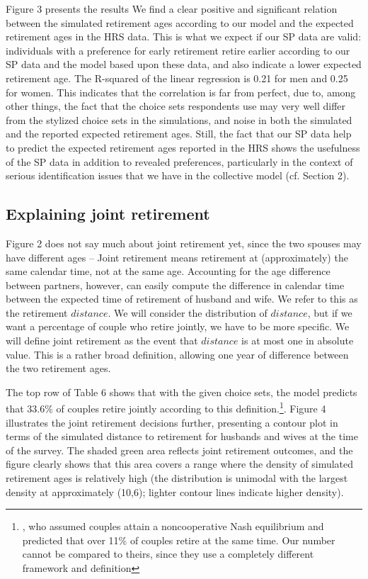 \documentclass[11pt,letter]{article}
\begin{document}
Figure 3 presents the results We find a clear positive and significant relation between the simulated retirement ages according to our model and the expected retirement ages in the HRS data. This is what we expect if our SP data are valid: individuals with a preference for early retirement retire earlier according to our SP data and the model based upon these data, and also indicate a lower expected retirement age. The R-squared of the linear regression is 0.21 for men and 0.25 for women. This indicates that the correlation is far from perfect, due to, among other things, the fact that the choice sets respondents use may very well differ from the stylized choice sets in the simulations, and noise in both the simulated and the reported expected retirement ages. Still, the fact that our SP data help to predict the expected retirement ages reported in the HRS shows the usefulness of the SP data in addition to revealed preferences, particularly in the context of serious identification issues that we have in the collective model (cf. Section 2).

\subsection*{Explaining joint retirement}
Figure 2 does not say much about joint retirement yet, since the two spouses may have different ages -- Joint retirement means retirement at (approximately) the same calendar time, not at the same age. Accounting for the age difference between partners, however, can easily compute the difference in calendar time between the expected time of retirement of husband and wife. We refer to this as the retirement $distance$. We will consider the distribution of $distance$, but if we want a percentage of couple who retire jointly, we have to be more specific. We will define joint retirement as the event that $distance$ is at most one in absolute value. This is a rather broad definition, allowing one year of difference between the two retirement ages.

The top row of Table 6 shows that with the given choice sets, the model predicts that 33.6\% of couples retire jointly according to this definition.\footnote{\citet{gustman2000retirement}, who assumed couples attain a noncooperative Nash equilibrium and predicted that over 11\% of couples retire at the same time. Our number cannot be compared to theirs, since they use a completely different framework and definition}. Figure 4 illustrates the joint retirement decisions further, presenting a contour plot in terms of the simulated distance to retirement for husbands and wives at the time of the survey. The shaded green area reflects joint retirement outcomes, and the figure clearly shows that this area covers a range where the density of simulated retirement ages is relatively high (the distribution is unimodal with the largest density at approximately (10,6); lighter contour lines indicate higher density).
\end{document}
